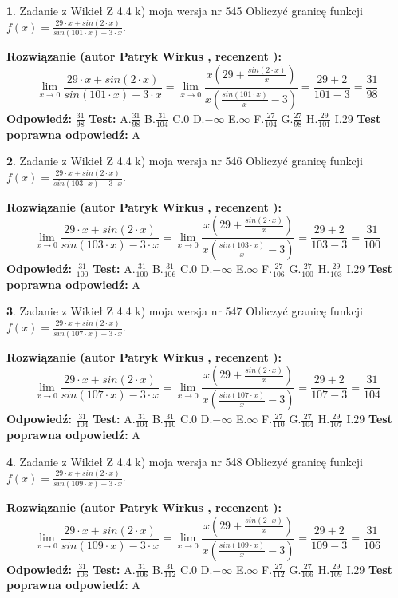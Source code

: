 \documentclass[12pt, a4paper]{article}
\theoremstyle{definition} %
\newtheorem{zad}{}
\newcommand{\zadStart}[1]{\begin{zad}#1\newline}
\newcommand{\zadStop}{\end{zad}}
\newcommand{\rozwStart}[2]{\noindent \textbf{Rozwiązanie (autor #1 , recenzent #2): }\newline}
\newcommand{\rozwStop}{\newline}
\newcommand{\odpStart}{\noindent \textbf{Odpowiedź:}\newline}
\newcommand{\odpStop}{\newline}
\newcommand{\testStart}{\noindent \textbf{Test:}\newline}
\newcommand{\testStop}{\newline}
\newcommand{\kluczStart}{\noindent \textbf{Test poprawna odpowiedź:}\newline}
\newcommand{\kluczStop}{\newline}
\begin{document}
\zadStart{Zadanie z Wikieł Z 4.4 k) moja wersja nr 545}
Obliczyć granicę funkcji $f(x)=\frac{29\cdot x +sin(2\cdot x)}{sin(101\cdot x) -3\cdot x}$.
\zadStop
\rozwStart{Patryk Wirkus}{}
$$\lim\limits_{x\to 0}\frac{29\cdot x +sin(2\cdot x)}{sin(101\cdot x) -3\cdot x}
=\lim\limits_{x\to 0}\frac{x(29+\frac{sin(2\cdot x)}{x})}{x(\frac{sin(101\cdot x)}{x}-3)}
=\frac{29+2}{101-3} = \frac{31}{98}$$
\rozwStop
\odpStart
$\frac{31}{98}$
\odpStop
\testStart
A.$\frac{31}{98}$
B.$\frac{31}{104}$
C.$0$
D.$-\infty$
E.$\infty$
F.$\frac{27}{104}$
G.$\frac{27}{98}$
H.$\frac{29}{101}$
I.$29$
\testStop
\kluczStart
A
\kluczStop



\zadStart{Zadanie z Wikieł Z 4.4 k) moja wersja nr 546}
Obliczyć granicę funkcji $f(x)=\frac{29\cdot x +sin(2\cdot x)}{sin(103\cdot x) -3\cdot x}$.
\zadStop
\rozwStart{Patryk Wirkus}{}
$$\lim\limits_{x\to 0}\frac{29\cdot x +sin(2\cdot x)}{sin(103\cdot x) -3\cdot x}
=\lim\limits_{x\to 0}\frac{x(29+\frac{sin(2\cdot x)}{x})}{x(\frac{sin(103\cdot x)}{x}-3)}
=\frac{29+2}{103-3} = \frac{31}{100}$$
\rozwStop
\odpStart
$\frac{31}{100}$
\odpStop
\testStart
A.$\frac{31}{100}$
B.$\frac{31}{106}$
C.$0$
D.$-\infty$
E.$\infty$
F.$\frac{27}{106}$
G.$\frac{27}{100}$
H.$\frac{29}{103}$
I.$29$
\testStop
\kluczStart
A
\kluczStop



\zadStart{Zadanie z Wikieł Z 4.4 k) moja wersja nr 547}
Obliczyć granicę funkcji $f(x)=\frac{29\cdot x +sin(2\cdot x)}{sin(107\cdot x) -3\cdot x}$.
\zadStop
\rozwStart{Patryk Wirkus}{}
$$\lim\limits_{x\to 0}\frac{29\cdot x +sin(2\cdot x)}{sin(107\cdot x) -3\cdot x}
=\lim\limits_{x\to 0}\frac{x(29+\frac{sin(2\cdot x)}{x})}{x(\frac{sin(107\cdot x)}{x}-3)}
=\frac{29+2}{107-3} = \frac{31}{104}$$
\rozwStop
\odpStart
$\frac{31}{104}$
\odpStop
\testStart
A.$\frac{31}{104}$
B.$\frac{31}{110}$
C.$0$
D.$-\infty$
E.$\infty$
F.$\frac{27}{110}$
G.$\frac{27}{104}$
H.$\frac{29}{107}$
I.$29$
\testStop
\kluczStart
A
\kluczStop



\zadStart{Zadanie z Wikieł Z 4.4 k) moja wersja nr 548}
Obliczyć granicę funkcji $f(x)=\frac{29\cdot x +sin(2\cdot x)}{sin(109\cdot x) -3\cdot x}$.
\zadStop
\rozwStart{Patryk Wirkus}{}
$$\lim\limits_{x\to 0}\frac{29\cdot x +sin(2\cdot x)}{sin(109\cdot x) -3\cdot x}
=\lim\limits_{x\to 0}\frac{x(29+\frac{sin(2\cdot x)}{x})}{x(\frac{sin(109\cdot x)}{x}-3)}
=\frac{29+2}{109-3} = \frac{31}{106}$$
\rozwStop
\odpStart
$\frac{31}{106}$
\odpStop
\testStart
A.$\frac{31}{106}$
B.$\frac{31}{112}$
C.$0$
D.$-\infty$
E.$\infty$
F.$\frac{27}{112}$
G.$\frac{27}{106}$
H.$\frac{29}{109}$
I.$29$
\testStop
\kluczStart
A
\kluczStop
\end{document}
